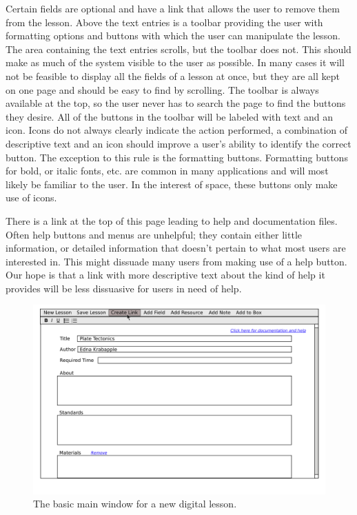 \documentclass[10pt,letter]{article}
\begin{document}
Certain fields are optional and have a link that allows the user to remove them
from the lesson. Above the text entries is a toolbar providing the user with
formatting options and buttons with which the user can manipulate the lesson.
The area containing the text entries scrolls, but the toolbar does not. This
should make as much of the system visible to the user as possible. In many cases
it will not be feasible to display all the fields of a lesson at once, but they
are all kept on one page and should be easy to find by scrolling. The toolbar is
always available at the top, so the user never has to search the page to find
the buttons they desire. All of the buttons in the toolbar will be labeled with
text and an icon. Icons do not always clearly indicate the action performed, a
combination of descriptive text and an icon should improve a user's ability to
identify the correct button. The exception to this rule is the formatting
buttons. Formatting buttons for bold, or italic fonts, etc. are common in many
applications and will most likely be familiar to the user. In the interest of
space, these buttons only make use of icons.

There is a link at the top of this page leading to help and documentation files.
Often help buttons and menus are unhelpful; they contain either little
information, or detailed information that doesn't pertain to what most users are
interested in. This might dissuade many users from making use of a help button.
Our hope is that a link with more descriptive text about the kind of help it
provides will be less dissuasive for users in need of help.

\begin{figure}
	\centering
	\includegraphics[width=0.9\linewidth]{../../low-fi_prototype/button_mouseover}
	\caption{The basic main window for a new digital lesson.}
	\label{fig: main window}
\end{figure}
\end{document}
